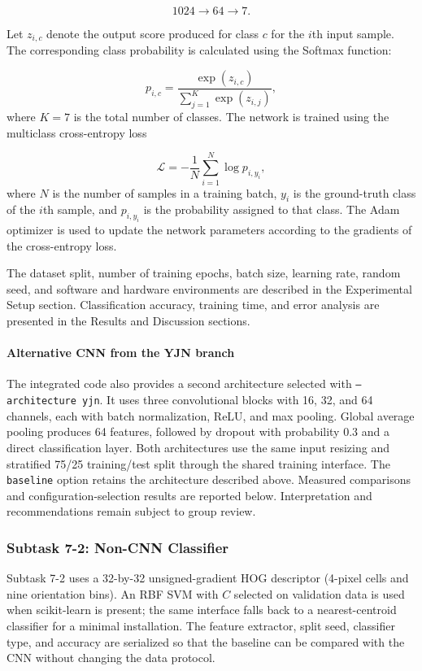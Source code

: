 \documentclass[11pt,a4paper]{article}
\begin{document}
\begin{equation}
1024\rightarrow64\rightarrow7.
\label{eq:cnn_classifier_dimensions}
\end{equation}

Let $z_{i,c}$ denote the output score produced for class $c$ for the
$i$th input sample. The corresponding class probability is calculated
using the Softmax function:

\begin{equation}
p_{i,c}
=
\frac{\exp(z_{i,c})}
{\displaystyle\sum_{j=1}^{K}\exp(z_{i,j})},
\label{eq:softmax}
\end{equation}
where $K=7$ is the total number of classes. The network is trained using
the multiclass cross-entropy loss

\begin{equation}
\mathcal{L}
=
-\frac{1}{N}
\sum_{i=1}^{N}
\log p_{i,y_i},
\label{eq:cross_entropy}
\end{equation}
where $N$ is the number of samples in a training batch, $y_i$ is the
ground-truth class of the $i$th sample, and $p_{i,y_i}$ is the
probability assigned to that class. The Adam optimizer is used to
update the network parameters according to the gradients of the
cross-entropy loss.

The dataset split, number of training epochs, batch size, learning
rate, random seed, and software and hardware environments are
described in the Experimental Setup section. Classification accuracy,
training time, and error analysis are presented in the Results and
Discussion sections.

\paragraph{Alternative CNN from the YJN branch}
The integrated code also provides a second architecture selected with
\texttt{--architecture yjn}. It uses three convolutional blocks with
16, 32, and 64 channels, each with batch normalization, ReLU, and
max pooling. Global average pooling produces 64 features, followed by
dropout with probability 0.3 and a direct classification layer.
Both architectures use the same input resizing and stratified 75/25
training/test split through the shared training interface. The
\texttt{baseline} option retains the architecture described above.
Measured comparisons and configuration-selection results are reported below.
Interpretation and recommendations remain subject to group review.

\subsubsection{Subtask 7-2: Non-CNN Classifier}
Subtask 7-2 uses a 32-by-32 unsigned-gradient HOG descriptor (4-pixel cells and nine
orientation bins). An RBF SVM with $C$ selected on validation data is used when scikit-learn is present;
the same interface falls back to a nearest-centroid classifier for a minimal
installation. The feature extractor, split seed, classifier type, and accuracy
are serialized so that the baseline can be compared with the CNN without
changing the data protocol.
\end{document}
